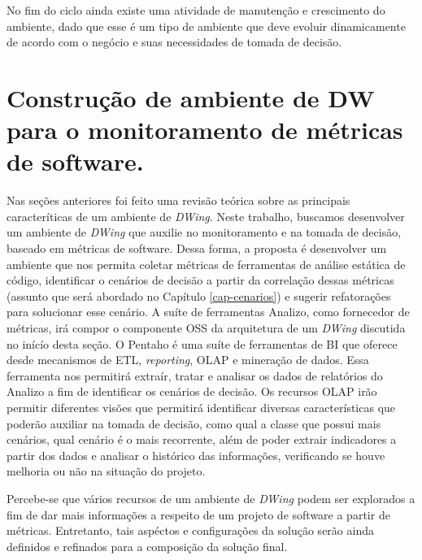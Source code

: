 No fim do ciclo ainda existe uma atividade de manutenção e crescimento do ambiente, dado que esse é um tipo de ambiente que deve evoluir dinamicamente de acordo com o negócio e suas necessidades de tomada de decisão.


\section{Construção de ambiente de DW para o monitoramento de métricas de software.}

%

Nas seções anteriores foi feito uma revisão teórica sobre as principais caracteríticas de um ambiente de \emph{DWing}. Neste trabalho, buscamos desenvolver um ambiente de \emph{DWing} que auxilie no monitoramento e na tomada de decisão, baseado em métricas de software. Dessa forma, a proposta é desenvolver um ambiente que nos permita coletar métricas de ferramentas de análise estática de código, identificar o cenários de decisão a partir da correlação dessas métricas (assunto que será abordado no Capítulo \ref{cap-cenarios}) e sugerir refatorações para solucionar esse cenário. A suíte de ferramentas Analizo, como fornecedor de métricas, irá compor o componente OSS da arquitetura de um \emph{DWing} discutida no inícío desta seção. O Pentaho é uma suíte de ferramentas de BI que oferece desde mecanismos de ETL, \emph{reporting}, OLAP e mineração de dados. Essa ferramenta nos permitirá extraír, tratar e analisar os dados de relatórios do Analizo a fim de identificar os cenários de decisão. Os recursos OLAP irão permitir diferentes visões que permitirá identificar diversas características que poderão auxiliar na tomada de decisão, como qual a classe que possui mais cenários, qual cenário é o mais recorrente, além de poder extrair indicadores a partir dos dados e analisar o histórico das informações, verificando se houve melhoria ou não na situação do projeto.

Percebe-se que vários recursos de um ambiente de \emph{DWing} podem ser explorados a fim de dar mais informações a respeito de um projeto de software a partir de métricas. Entretanto, tais aspéctos e configurações da solução serão ainda  definidos e refinados para a composição da solução final.

%

